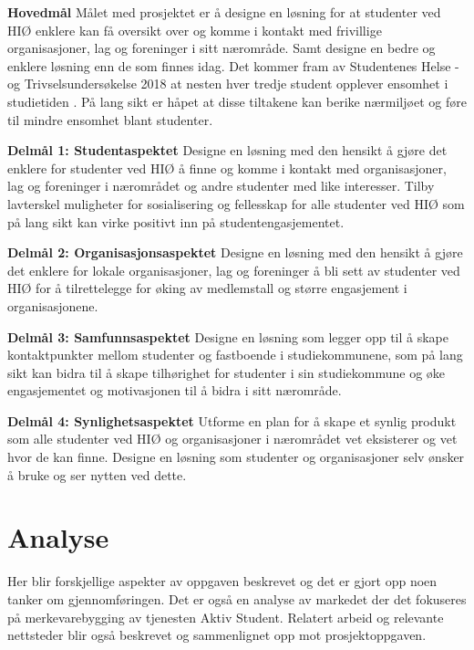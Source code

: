 \begin{compactitem}
\item [{\bf Hovedmål}] Målet med prosjektet er å designe en løsning for at studenter ved HIØ enklere kan få oversikt over og komme i kontakt med frivillige organisasjoner, lag og foreninger i sitt nærområde. Samt designe en bedre og enklere løsning enn de som finnes idag. Det kommer fram av Studentenes Helse -og Trivselsundersøkelse 2018 at nesten hver tredje student opplever ensomhet i studietiden \cite{SHOT:2}. På lang sikt er håpet at disse tiltakene kan berike nærmiljøet og føre til mindre ensomhet blant studenter.
\begin{compactitem}
\item [{\bf  Delmål 1: Studentaspektet} ] Designe en løsning med den hensikt å gjøre det enklere for studenter ved HIØ å finne og komme i kontakt med organisasjoner, lag og foreninger i nærområdet og andre studenter med like interesser. Tilby lavterskel muligheter for sosialisering og fellesskap for alle studenter ved HIØ som på lang sikt kan virke positivt inn på studentengasjementet.
\item [{\bf  Delmål 2: Organisasjonsaspektet} ] Designe en løsning med den hensikt å gjøre det enklere for lokale organisasjoner, lag og foreninger å bli sett av studenter ved HIØ for å tilrettelegge for øking av medlemstall og større engasjement i organisasjonene.
\item [{\bf  Delmål 3: Samfunnsaspektet} ] Designe en løsning som legger opp til å skape kontaktpunkter mellom studenter og fastboende i studiekommunene, som på lang sikt kan bidra til å skape tilhørighet for studenter i sin studiekommune og øke engasjementet og motivasjonen til å bidra i sitt nærområde.
\item [{\bf  Delmål 4: Synlighetsaspektet} ] Utforme en plan for å skape et synlig produkt som alle studenter ved HIØ og organisasjoner i nærområdet vet eksisterer og vet hvor de kan finne. Designe en løsning som studenter og organisasjoner selv ønsker å bruke og ser nytten ved dette.
\end{compactitem} 
\end{compactitem}

\section{Analyse}
Her blir forskjellige aspekter av oppgaven beskrevet og det er gjort opp noen tanker om gjennomføringen. Det er også en analyse av markedet der det fokuseres på merkevarebygging av tjenesten Aktiv Student. Relatert arbeid og relevante nettsteder blir også beskrevet og sammenlignet opp mot prosjektoppgaven.

